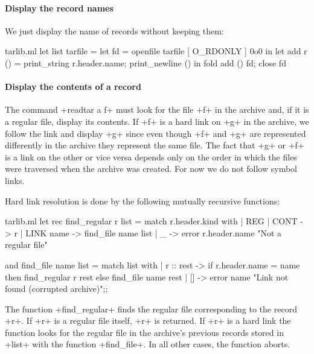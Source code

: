 \paragraph{Display the record names}
We just display the name of records without keeping them:
\begin{listingcodefile}{tarlib.ml}
let list tarfile =
  let fd = openfile tarfile [ O_RDONLY ] 0o0 in
  let add r () = print_string r.header.name; print_newline () in
  fold add () fd; 
  close fd
\end{listingcodefile}


\paragraph{Display the contents of a record}
The command \ml+readtar a f+ must look for the file \ml+f+ in the
archive and, if it is a regular file, display its contents. If \ml+f+
is a hard link on \ml+g+ in the archive, we follow the link and
display \ml+g+ since even though \ml+f+ and \ml+g+ are represented
differently in the archive they represent the same file. The fact that
\ml+g+ or \ml+f+ is a link on the other or vice versa depends only on
the order in which the files were traversed when the archive was
created. For now we do not follow symbol links.

Hard link resolution is done by the following mutually recursive
functions:
\begin{listingcodefile}{tarlib.ml}
let rec find_regular r list = match r.header.kind with
  | REG | CONT -> r
  | LINK name -> find_file name list
  | _ -> error r.header.name "Not a regular file" 

and find_file name list = match list with 
  | r :: rest -> 
      if r.header.name = name then find_regular r rest
      else find_file name rest
  | [] -> error name "Link not found (corrupted archive)";;
\end{listingcodefile}
The function \ml+find_regular+ finds the regular file corresponding to
the record \ml+r+.  If \ml+r+ is a regular file itself, \ml+r+ is
returned. If \ml+r+ is a hard link the function looks for the regular
file in the archive's previous records stored in \ml+list+ with the
function \ml+find_file+. In all other cases, the function aborts.

